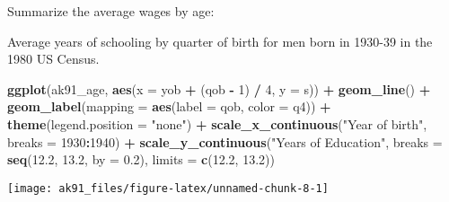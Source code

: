 \documentclass[]{book}
\newenvironment{Shaded}{\begin{snugshade}}{\end{snugshade}}
\newcommand{\KeywordTok}[1]{\textcolor[rgb]{0.13,0.29,0.53}{\textbf{#1}}}
\newcommand{\DataTypeTok}[1]{\textcolor[rgb]{0.13,0.29,0.53}{#1}}
\newcommand{\DecValTok}[1]{\textcolor[rgb]{0.00,0.00,0.81}{#1}}
\newcommand{\FloatTok}[1]{\textcolor[rgb]{0.00,0.00,0.81}{#1}}
\newcommand{\StringTok}[1]{\textcolor[rgb]{0.31,0.60,0.02}{#1}}
\newcommand{\OperatorTok}[1]{\textcolor[rgb]{0.81,0.36,0.00}{\textbf{#1}}}
\newcommand{\NormalTok}[1]{#1}
\theoremstyle{definition}
\theoremstyle{definition}
\theoremstyle{definition}
\theoremstyle{remark}
\begin{document}
Summarize the average wages by age:

\begin{Shaded}
\end{Shaded}

Average years of schooling by quarter of birth for men born in 1930-39
in the 1980 US Census.

\begin{Shaded}
\begin{Highlighting}[]
\KeywordTok{ggplot}\NormalTok{(ak91_age, }\KeywordTok{aes}\NormalTok{(}\DataTypeTok{x =}\NormalTok{ yob }\OperatorTok{+}\StringTok{ }\NormalTok{(qob }\OperatorTok{-}\StringTok{ }\DecValTok{1}\NormalTok{) }\OperatorTok{/}\StringTok{ }\DecValTok{4}\NormalTok{, }\DataTypeTok{y =}\NormalTok{ s)) }\OperatorTok{+}
\StringTok{  }\KeywordTok{geom_line}\NormalTok{() }\OperatorTok{+}
\StringTok{  }\KeywordTok{geom_label}\NormalTok{(}\DataTypeTok{mapping =} \KeywordTok{aes}\NormalTok{(}\DataTypeTok{label =}\NormalTok{ qob, }\DataTypeTok{color =}\NormalTok{ q4)) }\OperatorTok{+}
\StringTok{  }\KeywordTok{theme}\NormalTok{(}\DataTypeTok{legend.position =} \StringTok{"none"}\NormalTok{) }\OperatorTok{+}
\StringTok{  }\KeywordTok{scale_x_continuous}\NormalTok{(}\StringTok{"Year of birth"}\NormalTok{, }\DataTypeTok{breaks =} \DecValTok{1930}\OperatorTok{:}\DecValTok{1940}\NormalTok{) }\OperatorTok{+}
\StringTok{  }\KeywordTok{scale_y_continuous}\NormalTok{(}\StringTok{"Years of Education"}\NormalTok{, }\DataTypeTok{breaks =} \KeywordTok{seq}\NormalTok{(}\FloatTok{12.2}\NormalTok{, }\FloatTok{13.2}\NormalTok{, }\DataTypeTok{by =} \FloatTok{0.2}\NormalTok{), }\DataTypeTok{limits =} \KeywordTok{c}\NormalTok{(}\FloatTok{12.2}\NormalTok{, }\FloatTok{13.2}\NormalTok{))}
\end{Highlighting}
\end{Shaded}

\begin{center}\texttt{[image: ak91\_files/figure-latex/unnamed-chunk-8-1]} \end{center}
\end{document}
